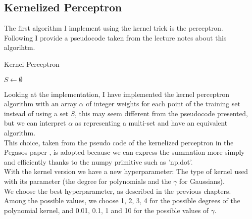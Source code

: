 \subsection{Kernelized Perceptron}

The first algorithm I implement using the kernel trick is the perceptron.\\
Following I provide a pseudocode taken from the lecture notes about this algorihtm.\\ 


\begin{algorithm}[H]
    \SetAlgoLined
    \DontPrintSemicolon
    \caption{Kernel Perceptron}
    $S \leftarrow \emptyset$ \\
\end{algorithm}

Looking at the implementation, I have implemented the kernel perceptron algorithm with an array $\alpha$ of integer weights for each point of the training set instead of using a set $S$, this may seem different from the pseudocode presented, but we can interpret $\alpha$ as representing a multi-set and have an equivalent algorithm.\\
This choice, taken from the pseudo code of the kernelized perceptron in the Pegasos paper \cite{Pegasos_paper}, is adopted because we can express the summation more simply and efficiently thanks to the numpy primitive such as 'np.dot'.\\

With the kernel version we have a new hyperparameter: The type of kernel used with its parameter (the degree for polynomials and the $\gamma$ for Gaussians).\\
We choose the best hyperparameter, as described in the previous chapters.\\
Among the possible values, we choose 1, 2, 3, 4 for the possible degrees of the polynomial kernel, and 0.01, 0.1, 1 and 10 for the possible values of $\gamma$.\\

